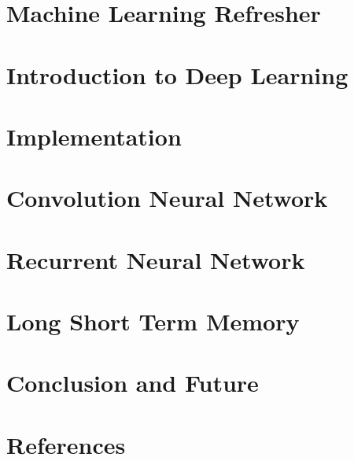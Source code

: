 \section[ML]{Machine Learning Refresher}


\section[Intro]{Introduction to Deep Learning}





\section[Libs]{Implementation}




\section[CNN]{Convolution Neural Network}





\section[RNN]{Recurrent Neural Network}




\section[LSTM]{Long Short Term Memory}



 
 
\section[End]{Conclusion and Future}



 \section[Refs]{References}
 
